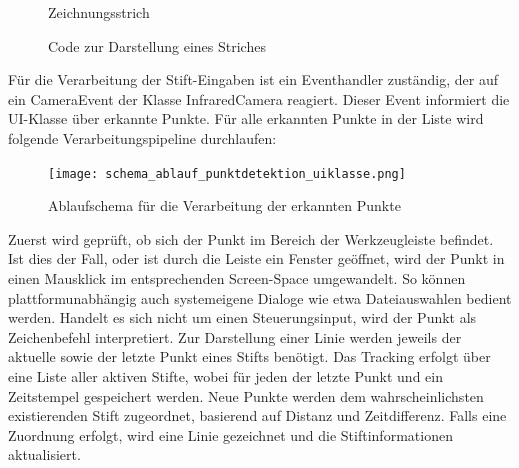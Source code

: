 \begin{figure}[H]
  \begin{minipage}{0.48\textwidth}
    \centering
    \caption{Zeichnungsstrich}
    \label{Fig:Data1}
  \end{minipage}
  \hfill
  \begin{minipage}{0.48\textwidth}
    \centering
    \caption{Code zur Darstellung eines Striches}
    \label{Fig:Data2}
  \end{minipage}
\end{figure}

\clearpage

Für die Verarbeitung der Stift-Eingaben ist ein Eventhandler zuständig, der auf ein CameraEvent der Klasse InfraredCamera reagiert. Dieser Event informiert die UI-Klasse über erkannte Punkte. Für alle erkannten Punkte in der Liste wird folgende Verarbeitungspipeline durchlaufen:

\begin{figure}[H]
    \centering
    \texttt{[image: schema\_ablauf\_punktdetektion\_uiklasse.png]}
    \caption{Ablaufschema für die Verarbeitung der erkannten Punkte}
    \label{fig:enter-label}
\end{figure}

Zuerst wird geprüft, ob sich der Punkt im Bereich der Werkzeugleiste befindet. Ist dies der Fall, oder ist durch die Leiste ein Fenster geöffnet, wird der Punkt in einen Mausklick im entsprechenden Screen-Space umgewandelt. So können plattformunabhängig auch systemeigene Dialoge wie etwa Dateiauswahlen bedient werden.
Handelt es sich nicht um einen Steuerungsinput, wird der Punkt als Zeichenbefehl interpretiert. Zur Darstellung einer Linie werden jeweils der aktuelle sowie der letzte Punkt eines Stifts benötigt. Das Tracking erfolgt über eine Liste aller aktiven Stifte, wobei für jeden der letzte Punkt und ein Zeitstempel gespeichert werden. Neue Punkte werden dem wahrscheinlichsten existierenden Stift zugeordnet, basierend auf Distanz und Zeitdifferenz. Falls eine Zuordnung erfolgt, wird eine Linie gezeichnet und die Stiftinformationen aktualisiert.

